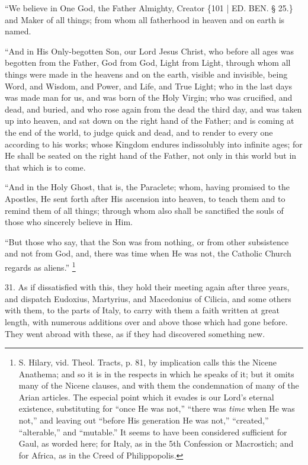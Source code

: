 ``We believe in One God, the
Father Almighty, Creator \{101 | ED. BEN. § 25.\} and
Maker of all things; from whom all fatherhood in heaven and on earth
is named.

``And in His Only-begotten Son,
our Lord Jesus Christ, who before all ages was begotten from the
Father, God from God, Light from Light, through whom all things were
made in the heavens and on the earth, visible and invisible, being
Word, and Wisdom, and Power, and Life, and True Light; who in the last
days was made man for us, and was born of the Holy Virgin; who was
crucified, and dead, and buried, and who rose again from the dead the
third day, and was taken up into heaven, and sat down on the right
hand of the Father; and is coming at the end of the world, to judge
quick and dead, and to render to every one according to his works;
whose Kingdom endures indissolubly into infinite ages; for He shall be
seated on the right hand of the Father, not only in this world but in
that which is to come.

``And in the Holy Ghost, that
is, the Paraclete; whom, having promised to the Apostles, He sent
forth after His ascension into heaven, to teach them and to remind
them of all things; through whom also shall be sanctified the souls of
those who sincerely believe in Him.

``But those who say, that the
Son was from nothing, or from other subsistence and not from God, and,
there was time when He was not, the Catholic Church regards as aliens.''
\footnote{S. Hilary, vid. Theol. Tracts, p. 81, by implication calls this the
Nicene Anathema; and so it is in the respects in which he speaks of
it; but it omits many of the Nicene clauses, and with them the
condemnation of many of the Arian articles. The especial point which
it evades is our Lord's eternal existence, substituting for ``once He
was not,'' ``there was \emph{time} when He was not,'' and leaving out ``before
His generation He was not,'' ``created,'' ``alterable,'' and ``mutable.'' It
seems to have been considered sufficient for Gaul, as worded here; for
Italy, as in the 5th Confession or Macrostich; and for Africa, as in
the Creed of Philippopolis.}

31. As if
dissatisfied with this, they hold their meeting again after three
years, and dispatch Eudoxius, Martyrius, and Macedonius of Cilicia,
and some others with them, to the parts of Italy, to carry with them a
faith written at great length, with numerous additions over and above
those which had gone before. They went abroad with these, as if they
had discovered something new.

